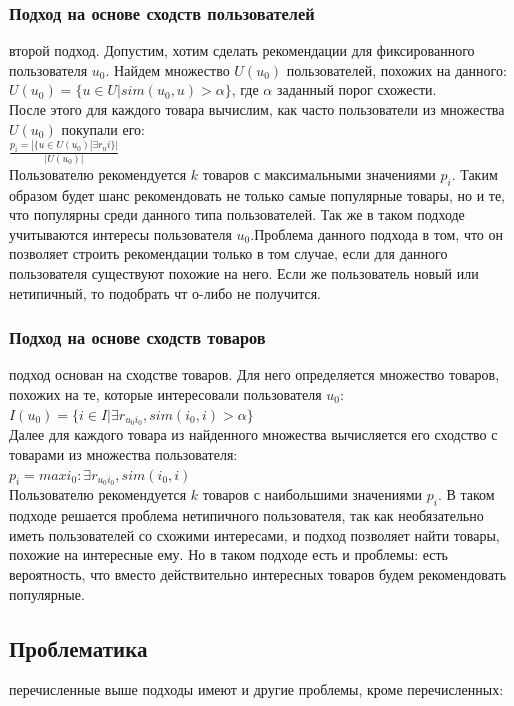 \documentclass{article}
\newcommand\tab[1][1cm]{\hspace*{#1}}
\begin{document}
\subsubsection*{Подход на основе сходств пользователей}
 второй подход. Допустим, хотим сделать рекомендации для фиксированного пользователя $u_0$. Найдем множество ﻿$U(u_0)$ пользователей, похожих на данного:\\
$U(u_0)=\{u\in U|sim(u_0,u)>\alpha\}$, где ﻿$\alpha$ заданный порог схожести.\\
После этого для каждого товара вычислим, как часто пользователи из множества $U(u_0)$ покупали его:\\
$\frac{p_i=|\{u\in U(u_0)|\exists r_ui\}|}{|U(u_0)|}$\\
Пользователю рекомендуется ﻿$k$ товаров с максимальными значениями ﻿$p_i$. Таким образом будет шанс рекомендовать не только самые популярные товары, но и те, что популярны среди данного типа пользователей. Так же в таком подходе учитываются интересы пользователя $u_0$﻿.Проблема данного подхода в том, что он позволяет строить рекомендации только в том случае, если для данного пользователя существуют похожие на него. Если же пользователь новый или нетипичный, то подобрать чт о-либо не получится.
\subsubsection*{Подход на основе сходств товаров}
 подход основан на сходстве товаров. Для него определяется множество товаров, похожих на те, которые интересовали пользователя ﻿$u_0$:\\
$I(u_0)=\{i\in I|\exists r_{u_0i_0}, sim(i_0,i)>\alpha \}$\\
Далее для каждого товара из найденного множества вычисляется его сходство с товарами из множества пользователя:\\
$p_i=max i_0: \exists r_{u_0i_0},sim(i_0,i)$\\
Пользователю рекомендуется ﻿$k$ товаров с наибольшими значениями $p_i$﻿. В таком подходе решается проблема нетипичного пользователя, так как необязательно иметь пользователей со схожими интересами, и подход позволяет найти товары, похожие на интересные ему. Но в таком подходе есть и проблемы: есть вероятность, что вместо действительно интересных товаров будем рекомендовать популярные.
\subsection*{Проблематика}
 перечисленные выше подходы имеют и другие проблемы, кроме перечисленных:
\end{document}
